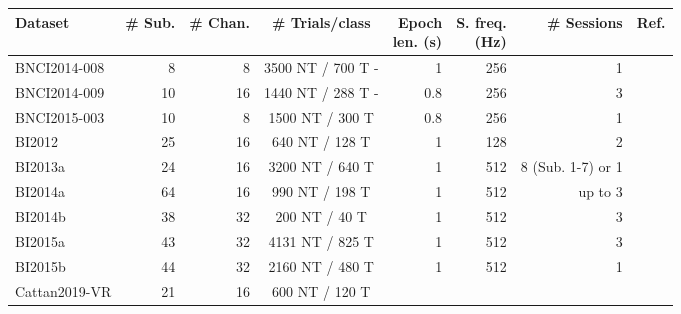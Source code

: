 \begin{tabularx}{\linewidth}{@{}Xrrcrrrr@{}}
               \toprule
               Dataset        & \# Sub.               & \# Chan. & \# Trials/class
                   & \makecell{Epoch \\ len. (s)} & \makecell{S. freq.\\  (Hz)}
                   & \# Sessions & Ref. \\ \midrule
               BNCI2014-008  & 8                          & 8           & 3500 NT / 700 T
            -     &1&256& 1                          &                                         \\
               BNCI2014-009  & 10                         & 16          & 1440 NT / 288 T
            -     &0.8&256& 3                          &                                         \\
               BNCI2015-003  & 10                         & 8           & 1500 NT / 300 T
                   &0.8&256& 1                          &                                          \\
               BI2012         & 25                         & 16          & 640 NT / 128 T
                   &1& 128 & 2                          &                                          \\
               BI2013a        & 24                         & 16          & 3200 NT / 640 T
                   &1&512& 8 (Sub. 1-7) or 1          &                                          \\
               BI2014a        & 64                         & 16          & 990 NT / 198 T
                   &1&512& up to 3                    &                                          \\
               BI2014b        & 38                         & 32          & 200 NT / 40 T
                   &1&512& 3                          &                                          \\
               BI2015a        & 43                         & 32          & 4131 NT / 825 T
                   &1&512& 3                          &                                          \\
               BI2015b        & 44                         & 32          & 2160 NT / 480 T
                   &1&512& 1                          &                                          \\
               Cattan2019-VR & 21                         & 16          & 600 NT / 120 T

\end{tabularx}
